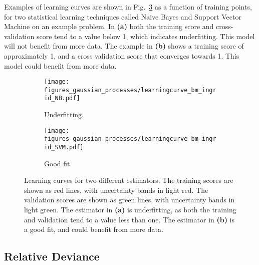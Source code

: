 \documentclass[twoside,english]{uiofysmaster}
\begin{document}
{{Examples of learning curves are shown in Fig.~\ref{Fig:: gaussian process : learning curves} as a function of training points, for two statistical learning techniques called Naive Bayes and Support Vector Machine on an example problem. In \textbf{(a)} both the training score and cross-validation score tend to a value below 1, which indicates underfitting. This model will not benefit from more data. The example in \textbf{(b)} shows a training score of approximately 1, and a cross validation score that converges towards 1. This model could benefit from more data.

\begin{figure}
    \centering
    \begin{subfigure}[b]{0.45\textwidth}
        \texttt{[image: figures\_gaussian\_processes/learningcurve\_bm\_ingrid\_NB.pdf]}
        \caption{Underfitting.}
        \label{fig:gull}
    \end{subfigure}
    \begin{subfigure}[b]{0.45\textwidth}
        \texttt{[image: figures\_gaussian\_processes/learningcurve\_bm\_ingrid\_SVM.pdf]}
        \caption{Good fit.}
        \label{fig:tiger}
    \end{subfigure}
\caption{Learning curves for two different estimators. The training scores are shown as red lines, with uncertainty bands in light red. The validation scores are shown as green lines, with uncertainty bands in light green. The estimator in \textbf{(a)} is underfitting, as both the training and validation tend to a value less than one. The estimator in \textbf{(b)} is a good fit, and could benefit from more data.}
\label{Fig:: gaussian process : learning curves}
\end{figure}



\subsection{Relative Deviance}\label{Sec:: gaussian process : Relative Deviance}

}}
\end{document}
